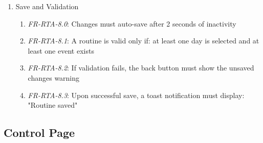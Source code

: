 \documentclass[conference]{IEEEtran}
\begin{document}
\begin{enumerate}
\begin{enumerate}
                            \item \textit{FR-RTA-7.3}: If a user attempts to add more than 20 events, an error message must display: "Maximum 20 events per routine"
                        \end{enumerate}
                    \item Save and Validation
                        \begin{enumerate}
                            \item \textit{FR-RTA-8.0}: Changes must auto-save after 2 seconds of inactivity
                            \item \textit{FR-RTA-8.1}: A routine is valid only if: at least one day is selected and at least one event exists
                            \item \textit{FR-RTA-8.2}: If validation fails, the back button must show the unsaved changes warning
                            \item \textit{FR-RTA-8.3}: Upon successful save, a toast notification must display: "Routine saved"
                        \end{enumerate}
                \end{enumerate}
        \subsection{\textbf{Control Page}}
\end{document}
